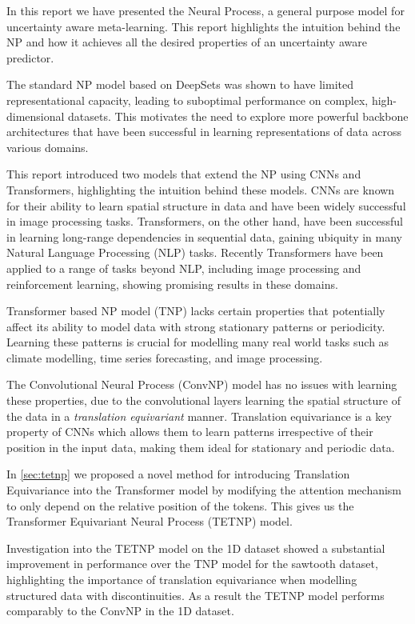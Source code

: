 \documentclass[../../main.tex]{subfiles}
\begin{document}
In this report we have presented the Neural Process, a general purpose model for uncertainty aware meta-learning. This report highlights the intuition behind the NP and how it achieves all the desired properties of an uncertainty aware predictor. 

The standard NP model based on DeepSets was shown to have limited representational capacity, leading to suboptimal performance on complex, high-dimensional datasets. This motivates the need to explore more powerful backbone architectures that have been successful in learning representations of data across various domains. 

This report introduced two models that extend the NP using CNNs and Transformers, highlighting the intuition behind these models. CNNs are known for their ability to learn spatial structure in data and have been widely successful in image processing tasks. Transformers, on the other hand, have been successful in learning long-range dependencies in sequential data, gaining ubiquity in many Natural Language Processing (NLP) tasks. Recently Transformers have been applied to a range of tasks beyond NLP, including image processing and reinforcement learning, showing promising results in these domains. 

Transformer based NP model (TNP) lacks certain properties that potentially affect its ability to model data with strong stationary patterns or periodicity. Learning these patterns is crucial for modelling many real world tasks such as climate modelling, time series forecasting, and image processing. 

The Convolutional Neural Process (ConvNP) model has no issues with learning these properties, due to the convolutional layers learning the spatial structure of the data in a \emph{translation equivariant} manner. Translation equivariance is a key property of CNNs which allows them to learn patterns irrespective of their position in the input data, making them ideal for stationary and periodic data.

In \autoref{sec:tetnp}  we proposed a novel method for introducing Translation Equivariance into the Transformer model by modifying the attention mechanism to only depend on the relative position of the tokens. This gives us the Transformer Equivariant Neural Process (TETNP) model.

Investigation into the TETNP model on the 1D dataset showed a substantial improvement in performance over the TNP model for the sawtooth dataset, highlighting the importance of translation equivariance when modelling structured data with discontinuities. As a result the TETNP model performs comparably to the ConvNP in the 1D dataset.
\end{document}
